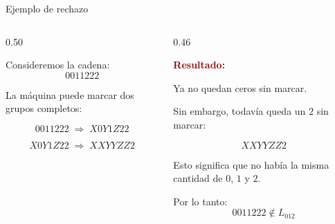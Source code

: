 \documentclass[aspectratio=1610, 12pt]{beamer}
\begin{document}
\begin{frame}[t]{Ejemplo de rechazo}
\vspace{4pt}
\begin{columns}[T]

  \begin{column}{0.50\textwidth}
    \begin{exbox}[Entrada]
      \footnotesize
      Consideremos la cadena:
      \[
        0011222
      \]

      \vspace{4pt}
      La máquina puede marcar dos grupos completos:

      \[
        0011222
        \;\Rightarrow\;
        X0Y1Z22
      \]

      \[
        X0Y1Z22
        \;\Rightarrow\;
        XXYYZZ2
      \]
    \end{exbox}
  \end{column}

  \begin{column}{0.46\textwidth}
    \begin{alertbox}
      \small
      \textcolor{DarkRed}{\textbf{Resultado:}}

      \vspace{4pt}
      Ya no quedan ceros sin marcar.

      \vspace{4pt}
      Sin embargo, todavía queda un $2$ sin marcar:

      \[
        XXYYZZ2
      \]

      \vspace{4pt}
      Esto significa que no había la misma cantidad de $0$, $1$ y $2$.

      \vspace{4pt}
      Por lo tanto:
      \[
        0011222 \notin L_{012}
      \]
    \end{alertbox}
  \end{column}

\end{columns}
\end{frame}
\end{document}
